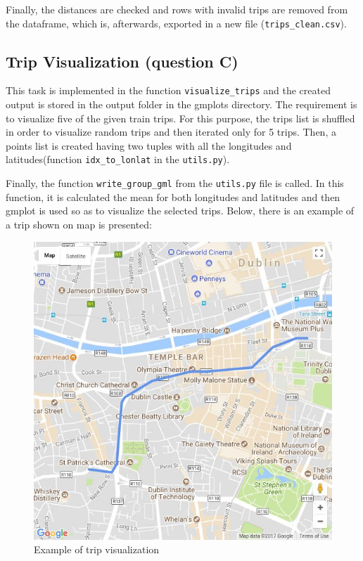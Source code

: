 \documentclass[12pt]{article}
\begin{document}
	Finally, the distances are checked and rows with invalid trips are removed from the dataframe, which is, afterwards, exported in a new file (\texttt{trips\_clean.csv}).
	
	\subsection{Trip Visualization (question C)}
	This task is implemented in the function \texttt{visualize\_trips} and the created output is stored in the output folder in the gmplots directory. The requirement is to visualize five of the given train trips. For this purpose, the trips list is shuffled in order to visualize random trips and then iterated only for 5 trips. Then, a points list is created having two tuples with all the longitudes and latitudes(function \texttt{idx\_to\_lonlat} in the \texttt{utils.py}). 
	
	Finally, the function \texttt{write\_group\_gml} from the \texttt{utils.py} file is called. In this function, it is calculated the mean for both longitudes and latitudes and then gmplot is used so as to visualize the selected trips. Below, there is an example of a trip shown on map is presented:
	
	\begin{figure} [H]
		\begin{center}
			\includegraphics [scale = 0.75] {questionCexample.jpg}
			\caption{Example of trip visualization}
		\end{center}
	\end{figure} 
	
\end{document}
